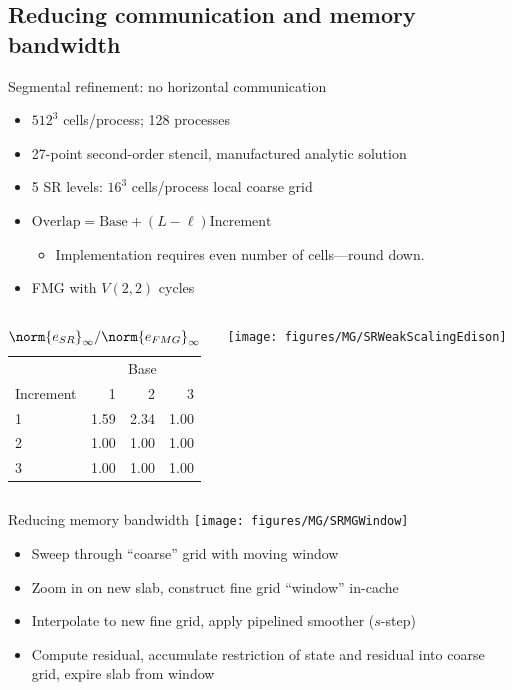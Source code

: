 \documentclass{beamer}
\begin{document}
\subsection{Reducing communication and memory bandwidth}

\begin{frame}{Segmental refinement: no horizontal communication}
  \begin{itemize}
  \item $512^3$ cells/process; 128 processes
  \item 27-point second-order stencil, manufactured analytic solution
  \item 5 SR levels: $16^3$ cells/process local coarse grid
  \item $\text{Overlap} = \text{Base} + (L-\ell) \text{Increment}$
    \begin{itemize}
    \item Implementation requires even number of cells---round down.
    \end{itemize}
  \item FMG with $V(2,2)$ cycles
  \end{itemize}
  \begin{columns}
    \begin{column}{0.5\textwidth}
      \begin{table}
        \centering\caption{$\norm{e_{SR}}_\infty / \norm{e_{FMG}}_\infty$}\label{tab:sr-error}
        \begin{tabular}{l rrr}
          \toprule
          & \multicolumn{3}{c}{Base} \\
          Increment & 1 & 2 & 3 \\
          \midrule
          1 & {\color{red} 1.59} & {\color{red} 2.34} & 1.00 \\
          2 & 1.00 & 1.00 & 1.00 \\
          3 & 1.00 & 1.00 & 1.00 \\
          \bottomrule
        \end{tabular}
      \end{table}
    \end{column}
    \begin{column}{0.5\textwidth}
      \texttt{[image: figures/MG/SRWeakScalingEdison]}
    \end{column}
  \end{columns}
\end{frame}

\begin{frame}{Reducing memory bandwidth}
  \texttt{[image: figures/MG/SRMGWindow]}
  \begin{itemize}
  \item Sweep through ``coarse'' grid with moving window
  \item Zoom in on new slab, construct fine grid ``window'' in-cache
  \item Interpolate to new fine grid, apply pipelined smoother ($s$-step)
  \item Compute residual, accumulate restriction of state and residual into coarse grid, expire slab from window
  \end{itemize}
\end{frame}
\end{document}
